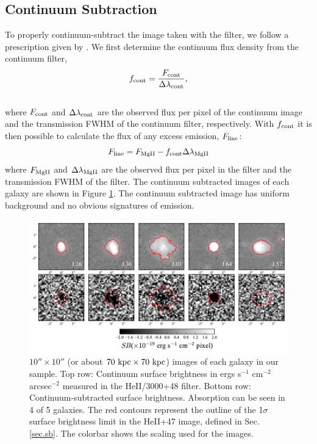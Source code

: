 \documentclass[twocolumn]{aastex61}
\begin{document}
\subsection{Continuum Subtraction}\label{subsec.cont_sub}

To properly continuum-subtract the image taken with the  filter, we follow a prescription given by \cite{Battaia_2015}. 
We first determine the continuum flux density from the continuum filter,
\begin{equation}
f_{\rm{cont}}=\frac{F_{\rm{cont}}}{\Delta \lambda_{\rm{cont}}},
\end{equation}\\
where $F_{\rm{cont}}$ and $\Delta \lambda_{\rm{cont}}$ are the observed flux per pixel of the continuum image and the transmission FWHM of the continuum filter, respectively. With $f_{\rm cont}$ it is then possible to calculate the flux of any excess emission, $F_{\rm{line}}$:
\begin{equation}
F_{\rm{line}}=F_{\rm{MgII}}-f_{\rm{cont}} \Delta \lambda_{\rm{MgII}}
\label{eq:subtraction}
\end{equation}
where $F_{\rm{MgII}}$ and $\Delta \lambda_{\rm MgII}$ are the observed flux per pixel in the  filter and the transmission FWHM of the  filter. The continuum subtracted images of each galaxy are shown in Figure \ref{fig:stamp_images}. The continuum subtracted image has uniform background and no obvious signatures of emission.

\begin{figure}[!htb]
\centering
\includegraphics[scale=0.7]{../Figures/stamps.pdf}
\caption{ $10'' \times 10''$ (or about $70 \rm \ kpc \times 70 \rm \ kpc $) images of each galaxy in our sample. Top row: Continuum surface brightness in ergs s$^{-1}$ cm$^{-2}$ arcsec$^{-2}$ measured in the HeII/3000+48 filter. Bottom row: Continuum-subtracted  surface brightness.  Absorption can be seen in 4 of 5 galaxies. The red contours represent the outline of the 1$\sigma$ surface brightness limit in the HeII+47 image, defined in Sec. \ref{sec.sb}. The colorbar shows the scaling used for the  images.}
\label{fig:stamp_images}
\end{figure}
\end{document}
